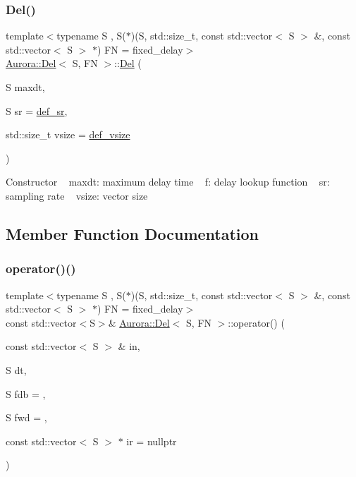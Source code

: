 \subsubsection{\texorpdfstring{Del()}{Del()}}
{\footnotesize\ttfamily template$<$typename S , S($\ast$)(\+S, std\+::size\+\_\+t, const std\+::vector$<$ S $>$ \&, const std\+::vector$<$ S $>$ $\ast$) FN = fixed\+\_\+delay$>$ \\
\hyperlink{class_aurora_1_1_del}{Aurora\+::\+Del}$<$ S, FN $>$\+::\hyperlink{class_aurora_1_1_del}{Del} (\begin{DoxyParamCaption}\item[{S}]{maxdt,  }\item[{S}]{sr = {\ttfamily \hyperlink{namespace_aurora_ad49263d809bea98dd422e95bc91bc03e}{def\+\_\+sr}},  }\item[{std\+::size\+\_\+t}]{vsize = {\ttfamily \hyperlink{namespace_aurora_afaaddf667a06e7ce23c667a8b7295263}{def\+\_\+vsize}} }\end{DoxyParamCaption})\hspace{0.3cm}{\ttfamily [inline]}}

Constructor ~\newline
maxdt\+: maximum delay time ~\newline
f\+: delay lookup function ~\newline
sr\+: sampling rate ~\newline
vsize\+: vector size 

\subsection{Member Function Documentation}
\mbox{\label{class_aurora_1_1_del_a6f76f29ff9f2cc2ef1838adac51f6fc5}} 
\subsubsection{\texorpdfstring{operator()()}{operator()()}\hspace{0.1cm}{\footnotesize\ttfamily [1/2]}}
{\footnotesize\ttfamily template$<$typename S , S($\ast$)(\+S, std\+::size\+\_\+t, const std\+::vector$<$ S $>$ \&, const std\+::vector$<$ S $>$ $\ast$) FN = fixed\+\_\+delay$>$ \\
const std\+::vector$<$S$>$\& \hyperlink{class_aurora_1_1_del}{Aurora\+::\+Del}$<$ S, FN $>$\+::operator() (\begin{DoxyParamCaption}\item[{const std\+::vector$<$ S $>$ \&}]{in,  }\item[{S}]{dt,  }\item[{S}]{fdb = {},  }\item[{S}]{fwd = {},  }\item[{const std\+::vector$<$ S $>$ $\ast$}]{ir = {\ttfamily nullptr} }\end{DoxyParamCaption})\hspace{0.3cm}{\ttfamily [inline]}}

